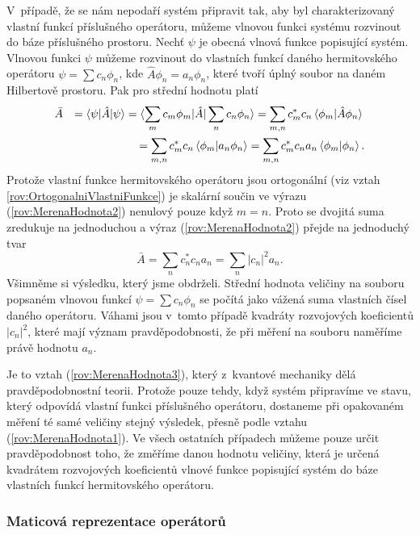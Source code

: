 V~případě, že se nám nepodaří systém připravit tak, aby byl charakterizovaný vlastní funkcí příslušného operátoru, můžeme vlnovou funkci systému rozvinout do báze příslušného prostoru. Nechť $\psi$ je obecná vlnová funkce popisující systém. Vlnovou funkci $\psi$ můžeme rozvinout do vlastních funkcí daného hermitovského operátoru $\psi=\sum c_n \phi_n$, kde $\hat{A}\phi_n = a_n \phi_n$, které tvoří úplný soubor na daném Hilbertově prostoru. Pak pro střední hodnotu platí
\begin{eqnarray}
&\bar{A}&=\braket{\psi|\hat{A}|\psi}= \braket{\sum_m c_m \phi_m|\hat{A}|\sum_n c_n \phi_n}=\sum_{m,n} c_m^\ast c_n \braket{\phi_m|\hat{A}\phi_n} {}
\nonumber\\
& & {}= \sum_{m,n} c_m^\ast c_n \braket{\phi_m|a_n \phi_n} = \sum_{m,n} c_m^\ast c_n a_n \braket{\phi_m|\phi_n} \mbox{.}
\label{rov:MerenaHodnota2}
\end{eqnarray}
Protože vlastní funkce hermitovského operátoru jsou ortogonální (viz vztah \eqref{rov:OrtogonalniVlastniFunkce}) je skalární součin ve výrazu (\ref{rov:MerenaHodnota2}) nenulový pouze když $m=n$. Proto se dvojitá suma zredukuje na jednoduchou a výraz (\ref{rov:MerenaHodnota2}) přejde na jednoduchý tvar
\begin{equation}
\bar{A} = \sum_n c_n^\ast c_n a_n = \sum_n |c_n|^2 a_n \mbox{.}
\label{rov:MerenaHodnota3}
\end{equation}
Všimněme si výsledku, který jsme obdrželi. Střední hodnota veličiny na souboru popsaném vlnovou funkcí $\psi=\sum c_n \phi_n$ se počítá jako vážená suma vlastních čísel daného operátoru. Váhami jsou v~tomto případě kvadráty rozvojových koeficientů $|c_n|^2$, které mají význam pravděpodobnosti, že při měření na souboru naměříme právě hodnotu $a_n$.

Je to vztah (\ref{rov:MerenaHodnota3}), který z~kvantové mechaniky dělá pravděpodobnostní teorii. Protože pouze tehdy, když systém připravíme ve stavu, který odpovídá vlastní funkci příslušného operátoru, dostaneme při opakovaném měření té samé veličiny stejný výsledek, přesně podle vztahu (\ref{rov:MerenaHodnota1}). Ve všech ostatních případech můžeme pouze určit pravděpodobnost toho, že změříme danou hodnotu veličiny, která je určená kvadrátem rozvojových koeficientů vlnové funkce popisující systém do báze vlastních funkcí hermitovského operátoru.


\subsubsection{Maticová reprezentace operátorů}


